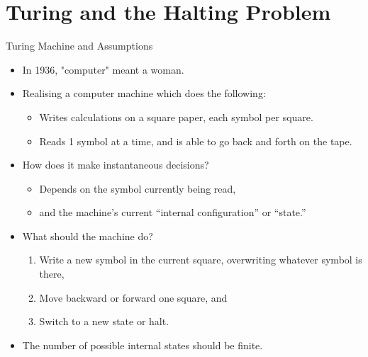 \documentclass[
    11pt, %
    aspectratio=169, %
]{beamer}
\begin{document}
\section{Turing and the Halting Problem}

\begin{frame}{Turing Machine and Assumptions}
 \begin{itemize}
    \item In 1936, "computer" meant a woman.
    \item Realising a computer machine which does the following:
    \begin{itemize}
        \item Writes calculations on a square paper, each symbol per square.
        \item Reads 1 symbol at a time, and is able to go back and forth on the tape.
        
        \newline
    \end{itemize}
    
    \item How does it make instantaneous decisions?
    \begin{itemize}
        \item Depends on the symbol currently being read,
        \item and the machine’s current “internal configuration”
or “state.” 
        \newline
    
    \end{itemize}
    \item What should the machine do?
    \begin{enumerate}
        \item  Write a new symbol in the current square,
overwriting whatever symbol is there,  
        \item  Move backward or forward one square, and
        \item  Switch to a new state or halt.
        \newline
    
    \end{enumerate}
    \item The number of possible internal states should be finite.
\end{itemize}
\end{frame}
\end{document}
